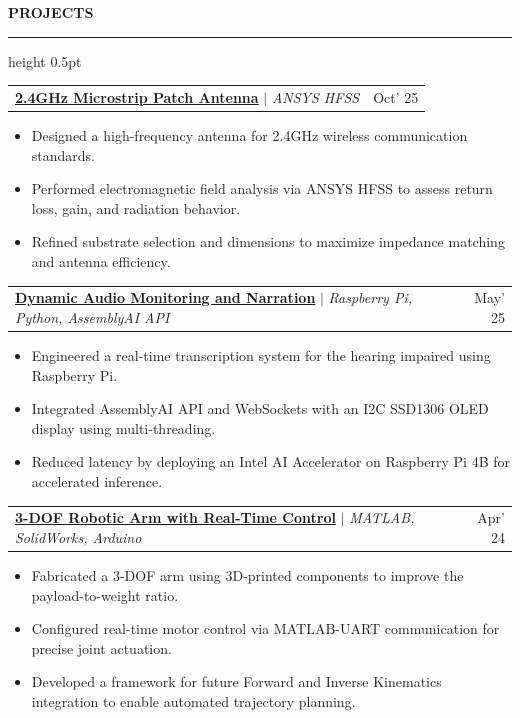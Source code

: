 \documentclass[10pt,a4paper]{article}
\newcommand{\resumeheading}[1]{
    \vspace{8pt}
    {\large\textbf{\color{resblue} #1}}
    \vspace{1pt}
    {\color{resblue}\hrule height 0.5pt}
    \vspace{4pt}
}
\begin{document}
\resumeheading{PROJECTS}
\begin{tabularx}{\textwidth}{@{}X r@{}}
\textbf{\color{resblue} \href{https://github.com/som-anshu/2.4GHz-microstrip-patch-antenna}{2.4GHz Microstrip Patch Antenna}} $|$ \textit{ANSYS HFSS} & Oct' 25
\end{tabularx}
\begin{itemize}[leftmargin=1.5em, itemsep=2pt, parsep=2pt, topsep=3pt]
    \item Designed a high-frequency antenna for 2.4GHz wireless communication standards.
    \item Performed electromagnetic field analysis via ANSYS HFSS to assess return loss, gain, and radiation behavior.
    \item Refined substrate selection and dimensions to maximize impedance matching and antenna efficiency.
\end{itemize}

\vspace{6pt}
\begin{tabularx}{\textwidth}{@{}X r@{}}
\textbf{\color{resblue} \href{https://github.com/som-anshu/damn}{Dynamic Audio Monitoring and Narration}} $|$ \textit{Raspberry Pi, Python, AssemblyAI API} & May' 25
\end{tabularx}
\begin{itemize}[leftmargin=1.5em, itemsep=2pt, parsep=2pt, topsep=3pt]
    \item Engineered a real-time transcription system for the hearing impaired using Raspberry Pi.
    \item Integrated AssemblyAI API and WebSockets with an I2C SSD1306 OLED display using multi-threading.
    \item Reduced latency by deploying an Intel AI Accelerator on Raspberry Pi 4B for accelerated inference.
\end{itemize}

\vspace{6pt}
\begin{tabularx}{\textwidth}{@{}X r@{}}
\textbf{\color{resblue} \href{https://github.com/som-anshu/MATLAB-controlled-robotic-manipulator}{3-DOF Robotic Arm with Real-Time Control}} $|$ \textit{MATLAB, SolidWorks, Arduino} & Apr' 24
\end{tabularx}
\begin{itemize}[leftmargin=1.5em, itemsep=2pt, parsep=2pt, topsep=3pt]
    \item Fabricated a 3-DOF arm using 3D-printed components to improve the payload-to-weight ratio.
    \item Configured real-time motor control via MATLAB-UART communication for precise joint actuation.
    \item Developed a framework for future Forward and Inverse Kinematics integration to enable automated trajectory planning.
\end{itemize}
\end{document}
